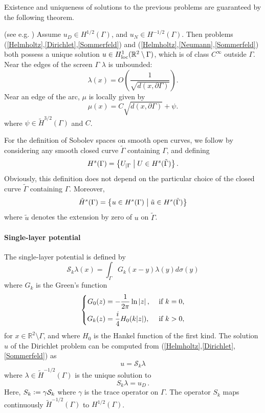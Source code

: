 \documentclass[a4paper]{article}
\begin{document}
\noindent Existence and uniqueness of solutions to the previous problems are guaranteed by the following theorem.
\begin{The}
	(see e.g. \cite{stephan1984augmented,wendland1990hypersingular,monch1996numerical}) Assume $u_D \in H^{1/2}(\Gamma)$, and $u_N \in H^{-1/2}(\Gamma)$. Then problems (\ref{Helmholtz},\ref{Dirichlet},\ref{Sommerfeld}) and (\ref{Helmholtz},\ref{Neumann},\ref{Sommerfeld}) both possess a unique solution $u \in H^1_\textup{loc}(\mathbb{R}^2 \setminus \Gamma)$, which is of class $C^{\infty}$ outside $\Gamma$. Near the edges of the screen $\Gamma$ $\lambda$ is unbounded:
	\[\lambda(x) = O\left(\frac{1}{\sqrt{d(x,\partial \Gamma)}}\right).\]
	Near an edge of the arc, $\mu$ is locally given by
	\[\mu(x) = C\sqrt{d(x,\partial \Gamma)} + \psi.\]
	where $\psi \in \tilde{H}^{3/2}(\Gamma)$ and $C$.
\end{The}
\noindent For the definition of Sobolev spaces on smooth open curves, we follow
\cite{mclean2000strongly} by considering any smooth closed curve $\tilde{\Gamma}$ containing $\Gamma$, and defining 
\[H^s(\Gamma) = \left\{U_{|\Gamma}\mathrel{}\middle|\mathrel{} U \in H^s(\tilde{\Gamma}) \right\}.\]
Obviously, this definition does not depend on the particular choice of the closed curve $\tilde{\Gamma}$ containing $\Gamma$. Moreover,
\[\tilde{H}^s(\Gamma) = \left\{u \in H^s(\Gamma)\mathrel{}\middle|\mathrel{}\tilde{u} \in H^s(\tilde{\Gamma})\right\}\]
where $\tilde{u}$ denotes the extension by zero of $u$ on $\tilde{\Gamma}$.

\paragraph{Single-layer potential}  
The single-layer potential is defined by
\begin{equation}
	\mathcal{S}_k\lambda(x) = \int_{\Gamma}G_k(x-y)\lambda(y)d\sigma(y)
	\label{defSk}
\end{equation}
	where $G_k$ is the Green's function
\begin{equation}
	\left\{
	\begin{aligned}
		G_0(z) &= -\dfrac{1}{2\pi} \ln \left\lvert z \right\rvert, && \text{ if } k= 0,\\
		G_k(z) &= \frac{i}{4}H_0(k|z|), && \text{ if } k > 0,
	\end{aligned} 
	\right.
\end{equation} 
for $x\in \mathbb{R}^2\setminus \Gamma$, and where $H_0$ is the Hankel function of the first kind. 
The solution $u$ of the Dirichlet problem can be computed from (\ref{Helmholtz},\ref{Dirichlet},\ref{Sommerfeld}) as
\begin{equation}
	u = \mathcal{S}_k \lambda
\end{equation}
where $\lambda \in \tilde{H}^{-1/2}(\Gamma)$ is the unique solution to 
\begin{equation}
	S_k \lambda = u_D\,.
	\label{Sklambda}
\end{equation}
Here, $S_k \mathrel{\mathop:}= \gamma \mathcal{S}_k$ where $\gamma$ is the trace operator on $\Gamma$. The operator $S_k$ maps continuously $\tilde{H}^{-1/2}(\Gamma)$ to $H^{1/2}(\Gamma)$.
\end{document}
